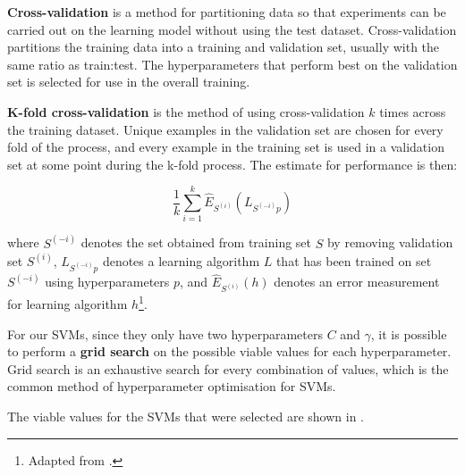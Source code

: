 \documentclass[12pt,a4paper,twoside,openright]{report}
\begin{document}
\textbf{Cross-validation} is a method for partitioning data so that experiments can be carried out
on the learning model without using the test dataset. Cross-validation partitions the
training data into a training and validation set, usually with the same ratio as
train:test. The hyperparameters that perform best on the
validation set is selected for use in the overall training.

\textbf{K-fold cross-validation} is the method of using cross-validation $k$ times across
the training dataset. Unique examples in the validation set 
are chosen for every fold of the process, and every example in the training set is used 
in a validation set at some point during
the k-fold process. The estimate for performance is then:

\begin{equation}
\frac{1}{k} \sum_{i = 1}^k \hat{E}_{S^{(i)}} (L_{S^{(-i)}p})
\end{equation}

where $S^{(-i)}$ denotes the set obtained from training set $S$ by removing
validation set $S^{(i)}$, $L_{S^{(-i)}p}$ denotes a learning algorithm
$L$ that has been trained on set $S^{(-i)}$ using hyperparameters $p$,
and $\hat{E}_{S^{(i)}} (h)$ denotes an error measurement
for learning algorithm $h$\footnote{Adapted from \cite{Holden18}.}.

For our SVMs, since they only have two hyperparameters $C$ and $\gamma$,
it is possible to perform a \textbf{grid search} on the possible viable values for each
hyperparameter. Grid search is an exhaustive search for every combination of values,
which is the common method of hyperparameter optimisation for SVMs.

The viable values for the SVMs that were selected are shown in .
\end{document}
